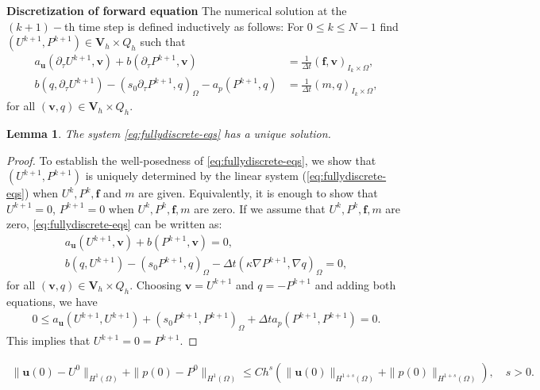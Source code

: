 \documentclass[10pt,a4paper]{amsart}
\newtheorem{lemma}{Lemma}
\newcommand{\LRp}[1]{\left( #1 \right)}
\newcommand{\algn}[1]{\begin{align} #1 \end{align}}
\newcommand{\algns}[1]{\begin{align*} #1 \end{align*}}
\newcommand{\ta}{\tau}
\begin{document}
\medskip
{\bf Discretization of forward equation} The numerical solution at the $(k+1)-$th time step is defined inductively as follows: For $0\le k \le N-1$ find $(U^{k+1}, P^{k+1}) \in \boldsymbol{V}_h \times Q_h$ such that
%
\begin{subequations}\label{eq:fullydiscrete-eqs}
	\algn{
		\label{eq:fullydiscrete-eq1}
		a_{\boldsymbol{u}} \LRp{\partial_\ta U^{k+1}, \boldsymbol{v}} + b \LRp{\partial_\ta P^{k+1}, \boldsymbol{v}} &= \frac{1}{\Delta t} \LRp{{\boldsymbol{f}}, \boldsymbol{v}}_{I_k\times\Omega}, \\
		\label{eq:fullydiscrete-eq2}
		b \LRp{q, \partial_\ta U^{k+1}} - \LRp{s_0 \partial_\ta P^{k+1}, q}_{\Omega} - a_p\LRp{ P^{k+1}, q} &= \frac{1}{\Delta t}\LRp{m, q}_{I_k\times\Omega}, 
	}    
\end{subequations}
for all $\LRp{\boldsymbol{v}, q} \in \boldsymbol{V}_h \times Q_h$. 
%
\begin{lemma}
    The system \eqref{eq:fullydiscrete-eqs} has a unique solution.     
\end{lemma}
%
\begin{proof}
To establish the well-posedness of \eqref{eq:fullydiscrete-eqs}, we show that $(U^{k+1}, P^{k+1})$ is uniquely determined by the linear system (\ref{eq:fullydiscrete-eqs})  when $U^{k}, P^{k}, {\boldsymbol{f}}$ and $m$ are given. Equivalently, it is enough to show that $U^{k+1}=0$,  $P^{k+1}=0$ when $U^{k}, P^{k}, \boldsymbol{f}, m$ are zero. If we assume that $U^{k}, P^{k}, \boldsymbol{f}, m$ are zero, \eqref{eq:fullydiscrete-eqs} can be written as:
\begin{subequations}
	\algns{
		a_{\boldsymbol{u}} \LRp{U^{k+1}, \boldsymbol{v}} + b \LRp{P^{k+1}, \boldsymbol{v}} = 0,
		\\
		b \LRp{q, U^{k+1}} - \LRp{s_0 P^{k+1}, q}_{\Omega} - \Delta t\LRp{{\kappa} \nabla P^{k+1}, \nabla q}_{\Omega} = 0, 
	}    
\end{subequations}
%
for all $\LRp{\boldsymbol{v}, q} \in \boldsymbol{V}_h \times Q_h$. Choosing $ \boldsymbol{v}=U^{k+1}$ and $q=-P^{k+1}$ and adding both equations, we have
\begin{align*}
	0\le  a_{\boldsymbol{u}} \LRp{U^{k+1}, U^{k+1}}+  \LRp{s_0 P^{k+1}, P^{k+1}}_{\Omega} +\Delta t a_p\LRp{ P^{k+1}, P^{k+1}}=0.
\end{align*}
This implies that $U^{k+1}=0 = P^{k+1}$.    
\end{proof}

\begin{align}
    \label{eq:initial-data-assumption}
    \|\boldsymbol{u}(0)-U^0\|_{H^1(\Omega)}+\|p(0)-P^0\|_{H^1(\Omega)}\le C h^{s}(\|\boldsymbol{u}(0)\|_{H^{1+s}(\Omega)}+\|p(0)\|_{H^{1+s}(\Omega)}), \quad s >0.
\end{align}
\end{document}
